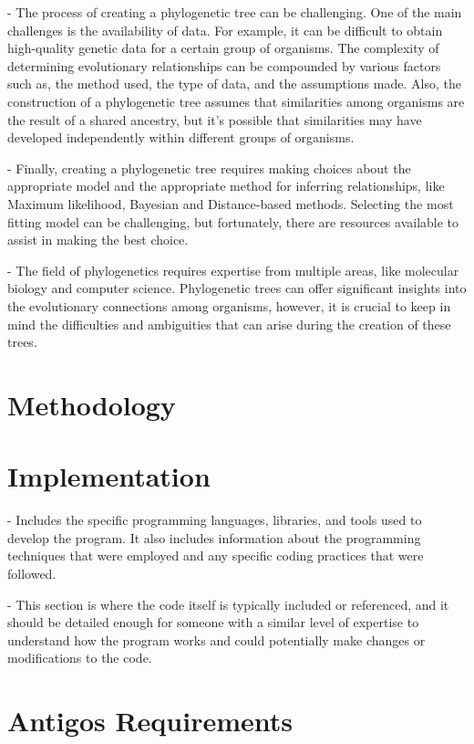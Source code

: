 \documentclass[12pt]{article}
\begin{document}
- The process of creating a phylogenetic tree can be challenging. One of the main challenges is the availability of data. For example, it can be difficult to obtain high-quality genetic data for a certain group of organisms. The complexity of determining evolutionary relationships can be compounded by various factors such as, the method used, the type of data, and the assumptions made. Also, the construction of a phylogenetic tree assumes that similarities among organisms are the result of a shared ancestry, but it's possible that similarities may have developed independently within different groups of organisms.

- Finally, creating a phylogenetic tree requires making choices about the appropriate model and the appropriate method for inferring relationships, like Maximum likelihood, Bayesian and Distance-based methods. Selecting the most fitting model can be challenging, but fortunately, there are resources available to assist in making the best choice.

- The field of phylogenetics requires expertise from multiple areas, like molecular biology and computer science. Phylogenetic trees can offer significant insights into the evolutionary connections among organisms, however, it is crucial to keep in mind the difficulties and ambiguities that can arise during the creation of these trees.


\section{Methodology}\label{sec:desenvolvimentos}


\section{Implementation}\label{sec:desenvolvimentos}

- Includes the specific programming languages, libraries, and tools used to develop the program. It also includes information about the programming techniques that were employed and any specific coding practices that were followed. 

- This section is where the code itself is typically included or referenced, and it should be detailed enough for someone with a similar level of expertise to understand how the program works and could potentially make changes or modifications to the code.

\section{Antigos Requirements}\label{sec:desenvolvimentos}
\end{document}
